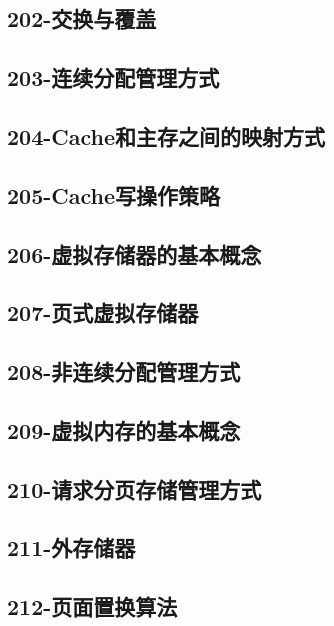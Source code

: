 \subsection{202-交换与覆盖}

\subsection{203-连续分配管理方式}

\subsection{204-Cache和主存之间的映射方式}

\subsection{205-Cache写操作策略}

\subsection{206-虚拟存储器的基本概念}

\subsection{207-页式虚拟存储器}

\subsection{208-非连续分配管理方式}

\subsection{209-虚拟内存的基本概念}

\subsection{210-请求分页存储管理方式}

\subsection{211-外存储器}

\subsection{212-页面置换算法}

